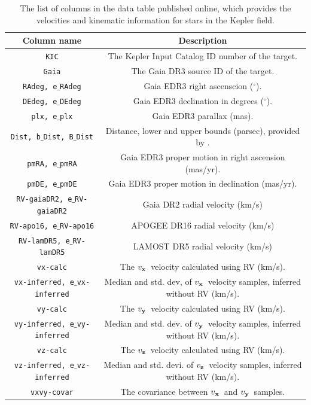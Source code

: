 \documentclass[]{aastex631}
\newcommand{\vx}{$v_{\bf x}$}
\newcommand{\vy}{$v_{\bf y}$}
\newcommand{\vz}{$v_{\bf z}$}
\begin{document}
\begin{table}[h!]
  \begin{center}
      \caption{
The list of columns in the data table published online, which provides
      the velocities and kinematic information for stars in the Kepler field.
      }
\label{tab:columns}
\begin{tabular}{cc}
    Column name & Description \\
\hline
    {\tt KIC} & The Kepler Input Catalog ID number of the target. \\
    {\tt Gaia} & The Gaia DR3 source ID of the target. \\
    {\tt RAdeg, e$\_$RAdeg} & Gaia EDR3 right ascenscion ($^\circ$). \\
    {\tt DEdeg, e$\_$DEdeg} & Gaia EDR3 declination in degrees ($^\circ$). \\
    {\tt plx, e$\_$plx} & Gaia EDR3 parallax (mas). \\
    {\tt Dist, b$\_$Dist, B$\_$Dist} & Distance, lower and upper bounds
    (parsec), provided by \citet{bailer-jones2021}. \\
    {\tt pmRA, e$\_$pmRA} & Gaia EDR3 proper motion in right ascension (mas/yr). \\
    {\tt pmDE, e$\_$pmDE} & Gaia EDR3 proper motion in declination (mas/yr). \\
    {\tt RV-gaiaDR2, e$\_$RV-gaiaDR2} & Gaia DR2 radial velocity (km/s) \\
    {\tt RV-apo16, e$\_$RV-apo16} & APOGEE DR16 radial velocity (km/s) \\
    {\tt RV-lamDR5, e$\_$RV-lamDR5} & LAMOST DR5 radial velocity (km/s) \\
    {\tt vx-calc} & The \vx\ velocity calculated using RV (km/s). \\
    {\tt vx-inferred, e$\_$vx-inferred} & Median and std.
    dev, of \vx\ velocity samples, inferred without RV (km/s). \\
    {\tt vy-calc} & The \vy\ velocity calculated using RV (km/s). \\
    {\tt vy-inferred, e$\_$vy-inferred} & Median and std.
    dev. of \vy\ velocity samples, inferred without RV (km/s). \\
    {\tt vz-calc} & The \vz\ velocity calculated using RV (km/s). \\
    {\tt vz-inferred, e$\_$vz-inferred} & Median and std.
    devi. of \vz\ velocity samples, inferred without RV (km/s). \\
    {\tt vxvy-covar} & The covariance between \vx\ and \vy\ samples. \\

\end{tabular}
\end{center}
\end{table}
\end{document}

